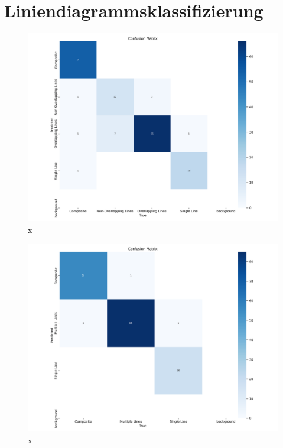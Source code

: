 \section{Liniendiagrammsklassifizierung}
\begin{figure}[H]
    \centering
    \captionsetup{width=1\linewidth}
    \includegraphics[width=1\textwidth]{Experimente/img/classify/val_v1/confusion_matrix.png}
    \caption{ x}
    \label{fig:extraction_output}
\end{figure}
\begin{figure}[H]
    \centering
    \captionsetup{width=1\linewidth}
    \includegraphics[width=1\textwidth]{Experimente/img/classify/val_v2/confusion_matrix.png}
    \caption{ x}
    \label{fig:extraction_output}
\end{figure}

